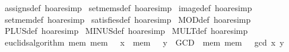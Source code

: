 \begin{isabellebody}
{}%
\endisatagML
{\isafoldML}%
%
\isadelimML
\isanewline
%
\endisadelimML
\isanewline
{}\isamarkupfalse%
\ assigns{}def\ {}hoare{}simp{}\isanewline
{}\isamarkupfalse%
\ set{}mems{}def\ {}hoare{}simp{}\isanewline
{}\isamarkupfalse%
\ image{}def\ {}hoare{}simp{}\isanewline
{}\isamarkupfalse%
\ set{}mem{}def\ {}hoare{}simp{}\isanewline
{}\isamarkupfalse%
\ satisfies{}def\ {}hoare{}simp{}\isanewline
{}\isamarkupfalse%
\ MOD{}def\ {}hoare{}simp{}\isanewline
{}\isamarkupfalse%
\ PLUS{}def\ {}hoare{}simp{}\isanewline
{}\isamarkupfalse%
\ MINUS{}def\ {}hoare{}simp{}\isanewline
{}\isamarkupfalse%
\ MULT{}def\ {}hoare{}simp{}\isanewline
\isanewline
{}\isamarkupfalse%
\ euclids{}algorithm{}\ {}{}mem{}\ mem\ {}\ {}\ x\ {}\ mem\ {}\ {}\ y{}\ {}\ GCD\ {}\ {}mem{}\ mem\ {}\ {}\ gcd\ x\ y{}{}\isanewline

\end{isabellebody}

